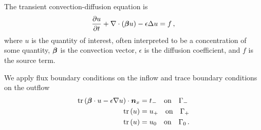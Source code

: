 \documentclass{article}
\begin{document}
The transient convection-diffusion equation is
\begin{equation*}
\frac{\partial u}{\partial t}+\nabla\cdot(\boldsymbol\beta u)-\epsilon\Delta u=f\,,
\end{equation*}
where $u$ is the quantity of interest, often interpreted to be a concentration of some quantity, $\boldsymbol\beta$ is the convection vector,
$\epsilon$ is the  diffusion coefficient, and $f$ is the source term.

We apply flux boundary conditions on the inflow and trace boundary conditions on the outflow
\begin{align*}
\operatorname*{tr}\left( \boldsymbol\beta\cdot u-\epsilon\nabla u \right)\cdot\boldsymbol n_x&=t_-\quad\text{on}\quad\Gamma_-\\
\operatorname*{tr}\left( u \right)&=u_+\quad\text{on}\quad\Gamma_+\\
\operatorname*{tr}\left( u \right)&=u_0\quad\text{on}\quad\Gamma_0\,.
\end{align*}
\end{document}
